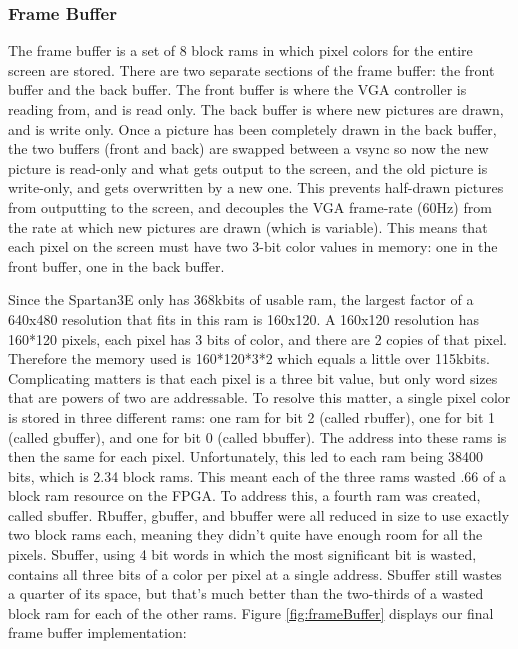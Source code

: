 \documentclass[onecolumn]{IEEEtran}
\begin{document}
\subsubsection{Frame Buffer}
The frame buffer is a set of 8 block rams in which pixel colors for the entire screen are stored.  There are two separate sections of the frame buffer: the front buffer and the back buffer.  The front buffer is where the VGA controller is reading from, and is read only.  The back buffer is where new pictures are drawn, and is write only.  Once a picture has been completely drawn in the back buffer, the two buffers (front and back) are swapped between a vsync so now the new picture is read-only and what gets output to the screen, and the old picture is write-only, and gets overwritten by a new one.  This prevents half-drawn pictures from outputting to the screen, and decouples the VGA frame-rate (60Hz) from the rate at which new pictures are drawn (which is variable).  This means that each pixel on the screen must have two 3-bit color values in memory: one in the front buffer, one in the back buffer.  

Since the Spartan3E only has 368kbits of usable ram, the largest factor of a 640x480 resolution that fits in this ram is 160x120.  A 160x120 resolution has 160*120 pixels, each pixel has 3 bits of color, and there are 2 copies of that pixel.  Therefore the memory used is 160*120*3*2 which equals a little over 115kbits.  Complicating matters is that each pixel is a three bit value, but only word sizes that are powers of two are addressable.  To resolve this matter, a single pixel color is stored in three different rams: one ram for bit 2 (called rbuffer), one for bit 1 (called gbuffer), and one for bit 0 (called bbuffer).  The address into these rams is then the same for each pixel.  Unfortunately, this led to each ram being 38400 bits, which is 2.34 block rams.  This meant each of the three rams wasted .66 of a block ram resource on the FPGA.  To address this, a fourth ram was created, called sbuffer.  Rbuffer, gbuffer, and bbuffer were all reduced in size to use exactly two block rams each, meaning they didn’t quite have enough room for all the pixels.  Sbuffer, using 4 bit words in which the most significant bit is wasted, contains all three bits of a color per pixel at a single address.  Sbuffer still wastes a quarter of its space, but that’s much better than the two-thirds of a wasted block ram for each of the other rams.  Figure \ref{fig:frameBuffer} displays our final frame buffer implementation:
\end{document}
